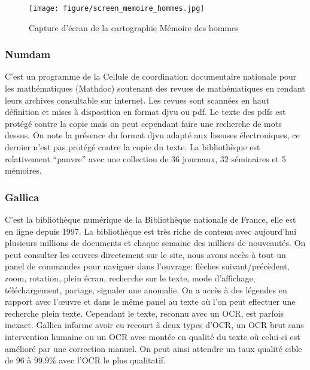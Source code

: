        \begin{figure}[ht!]
            \centering
            \texttt{[image: figure/screen\_memoire\_hommes.jpg]}
            \caption{Capture d'écran de la cartographie Mémoire des hommes}
            \label{fig:gallica}
        \end{figure}

        \subsubsection{Numdam}
        \label{subsubsec:numdam}
        C’est un programme de la Cellule de coordination documentaire nationale pour les mathématiques (Mathdoc) soutenant des revues de mathématiques en rendant leurs archives consultable sur internet. Les revues sont scannées en haut définition et mises à disposition en format djvu ou pdf. Le texte des pdfs est protégé contre la copie mais on peut cependant faire une recherche de mots dessus. On note la présence du format djvu adapté aux liseuses électroniques, ce dernier n’est pas protégé contre la copie du texte. La bibliothèque est relativement “pauvre” avec une collection de 36 journaux, 32 séminaires et 5 mémoires.

        \subsubsection{Gallica}
        \label{subsubsec:gallica}
        C’est la bibliothèque numérique de la Bibliothèque nationale de France, elle est en ligne depuis 1997. La bibliothèque est très riche de contenu avec aujourd’hui plusieurs millions de documents et chaque semaine des milliers de nouveautés. On peut consulter les œuvres directement sur le site, nous avons accès à tout un panel de commandes pour naviguer dans l’ouvrage: flèches suivant/précèdent, zoom, rotation, plein écran, recherche sur le texte, mode d’affichage, téléchargement, partage, signaler une anomalie. On a accès à des légendes en rapport avec l’œuvre et dans le même panel au texte où l’on peut effectuer une recherche plein texte. Cependant le texte, reconnu avec un OCR, est parfois inexact. Gallica informe avoir eu recourt à deux types d’OCR, un OCR brut sans intervention humaine ou un OCR avec montée en qualité du texte où celui-ci est amélioré par une correction manuel. On peut ainsi attendre un taux qualité cible de 96 à 99.9\% avec l’OCR le plus qualitatif. 

